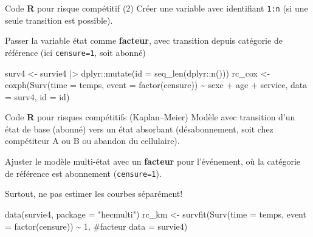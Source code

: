 \documentclass[
  ignorenonframetext,
]{beamer}
\newenvironment{Shaded}{\begin{snugshade}}{\end{snugshade}}
\newcommand{\AttributeTok}[1]{\textcolor[rgb]{0.40,0.45,0.13}{#1}}
\newcommand{\CommentTok}[1]{\textcolor[rgb]{0.37,0.37,0.37}{#1}}
\newcommand{\DecValTok}[1]{\textcolor[rgb]{0.68,0.00,0.00}{#1}}
\newcommand{\FunctionTok}[1]{\textcolor[rgb]{0.28,0.35,0.67}{#1}}
\newcommand{\NormalTok}[1]{\textcolor[rgb]{0.00,0.23,0.31}{#1}}
\newcommand{\OtherTok}[1]{\textcolor[rgb]{0.00,0.23,0.31}{#1}}
\newcommand{\SpecialCharTok}[1]{\textcolor[rgb]{0.37,0.37,0.37}{#1}}
\newcommand{\StringTok}[1]{\textcolor[rgb]{0.13,0.47,0.30}{#1}}
\begin{document}
\begin{frame}[fragile]{Code \textbf{R} pour risque compétitif (2)}
\protect\hypertarget{code-r-pour-risque-compuxe9titif-2}{}
Créer une variable avec identifiant \texttt{1:n} (si une seule
transition est possible).

Passer la variable état comme \textbf{facteur}, avec transition depuis
catégorie de référence (ici \texttt{censure=1}, soit abonné)

\begin{Shaded}
\begin{Highlighting}[numbers=left,,]
\NormalTok{surv4 }\OtherTok{\textless{}{-}}\NormalTok{ survie4 }\SpecialCharTok{|\textgreater{}} 
\NormalTok{  dplyr}\SpecialCharTok{::}\FunctionTok{mutate}\NormalTok{(}\AttributeTok{id =} \FunctionTok{seq\_len}\NormalTok{(dplyr}\SpecialCharTok{::}\FunctionTok{n}\NormalTok{()))}
\NormalTok{rc\_cox }\OtherTok{\textless{}{-}} \FunctionTok{coxph}\NormalTok{(}\FunctionTok{Surv}\NormalTok{(}\AttributeTok{time =}\NormalTok{ temps, }
             \AttributeTok{event =} \FunctionTok{factor}\NormalTok{(censure)) }\SpecialCharTok{\textasciitilde{}} 
\NormalTok{               sexe }\SpecialCharTok{+}\NormalTok{ age }\SpecialCharTok{+}\NormalTok{ service,}
             \AttributeTok{data =}\NormalTok{ surv4,}
             \AttributeTok{id =}\NormalTok{ id)}
\end{Highlighting}
\end{Shaded}
\end{frame}

\begin{frame}[fragile]{Code \textbf{R} pour risques compétitifs
(Kaplan--Meier)}
\protect\hypertarget{code-r-pour-risques-compuxe9titifs-kaplanmeier}{}
Modèle avec transition d'un état de base (abonné) vers un état absorbant
(désabonnement, soit chez compétiteur A ou B ou abandon du cellulaire).

Ajuster le modèle multi-état avec un \textbf{facteur} pour l'événement,
où la catégorie de référence est abonnement (\texttt{censure=1}).

Surtout, ne pas estimer les courbes séparément!

\begin{Shaded}
\begin{Highlighting}[numbers=left,,]
\FunctionTok{data}\NormalTok{(survie4, }\AttributeTok{package =} \StringTok{"hecmulti"}\NormalTok{)}
\NormalTok{rc\_km }\OtherTok{\textless{}{-}} \FunctionTok{survfit}\NormalTok{(}\FunctionTok{Surv}\NormalTok{(}\AttributeTok{time =}\NormalTok{ temps, }
             \AttributeTok{event =} \FunctionTok{factor}\NormalTok{(censure)) }\SpecialCharTok{\textasciitilde{}} \DecValTok{1}\NormalTok{, }\CommentTok{\#facteur}
             \AttributeTok{data =}\NormalTok{ survie4)}
\end{Highlighting}
\end{Shaded}
\end{frame}
\end{document}
